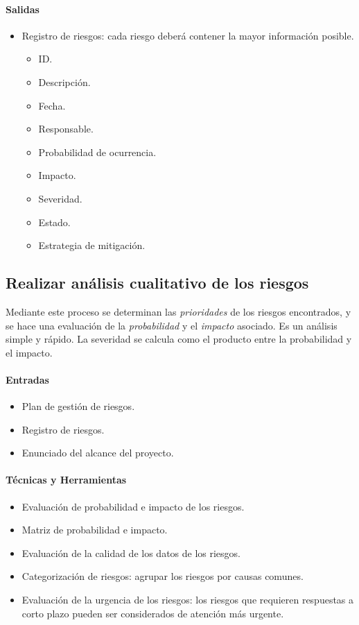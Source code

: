 \documentclass[a4paper,twosides]{article}
\newlength{\wideitemsep}
\let\olditem\item
\renewcommand{\item}{\setlength{\itemsep}{\wideitemsep}\olditem}
\begin{document}
\paragraph{Salidas}
\begin{itemize}
\item Registro de riesgos: cada riesgo deberá contener la mayor información posible.
\begin{itemize}
\item ID.
\item Descripción.
\item Fecha.
\item Responsable.
\item Probabilidad de ocurrencia.
\item Impacto.
\item Severidad.
\item Estado.
\item Estrategia de mitigación.
\end{itemize}
\end{itemize}
\subsection{Realizar análisis cualitativo de los riesgos} \label{sec:analisis_cualitativo}
Mediante este proceso se determinan las \emph{prioridades} de los riesgos encontrados, y se hace una evaluación de la \emph{probabilidad} y el \emph{impacto} asociado. Es un análisis simple y rápido. La severidad se calcula como el producto entre la probabilidad y el impacto.

\paragraph{Entradas}
\begin{itemize}
\item Plan de gestión de riesgos.
\item Registro de riesgos.
\item Enunciado del alcance del proyecto.
\end{itemize}

\paragraph{Técnicas y Herramientas}
\begin{itemize}
\item Evaluación de probabilidad e impacto de los riesgos.
\item Matriz de probabilidad e impacto.
\item Evaluación de la calidad de los datos de los riesgos.
\item Categorización de riesgos: agrupar los riesgos por causas comunes.
\item Evaluación de la urgencia de los riesgos: los riesgos que requieren respuestas a corto plazo pueden ser considerados de atención más urgente.
\end{itemize}
\end{document}

